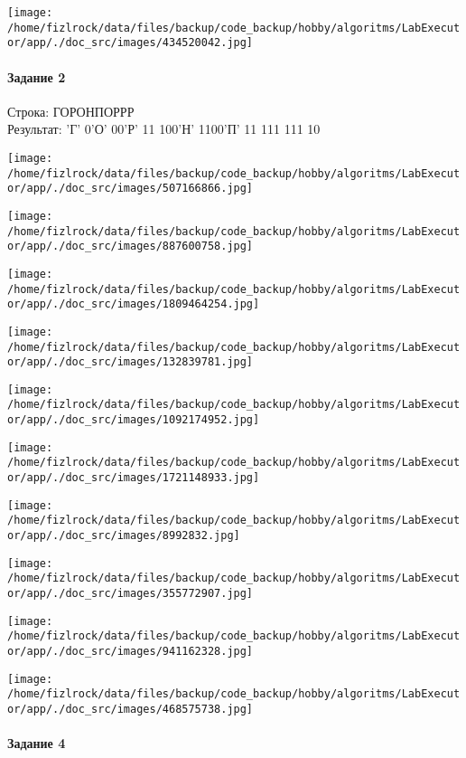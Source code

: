 \documentclass[a4paper, 12pt]{article}
\begin{document}
\texttt{[image: /home/fizlrock/data/files/backup/code\_backup/hobby/algoritms/LabExecutor/app/./doc\_src/images/434520042.jpg]}
\pagebreak
\paragraph{Задание 2}

Строка: 
ГОРОНПОРРР\\
Результат: 'Г' 0'О' 00'Р' 11 100'Н' 1100'П' 11 111 111 10

\texttt{[image: /home/fizlrock/data/files/backup/code\_backup/hobby/algoritms/LabExecutor/app/./doc\_src/images/507166866.jpg]}

\texttt{[image: /home/fizlrock/data/files/backup/code\_backup/hobby/algoritms/LabExecutor/app/./doc\_src/images/887600758.jpg]}

\texttt{[image: /home/fizlrock/data/files/backup/code\_backup/hobby/algoritms/LabExecutor/app/./doc\_src/images/1809464254.jpg]}

\texttt{[image: /home/fizlrock/data/files/backup/code\_backup/hobby/algoritms/LabExecutor/app/./doc\_src/images/132839781.jpg]}

\texttt{[image: /home/fizlrock/data/files/backup/code\_backup/hobby/algoritms/LabExecutor/app/./doc\_src/images/1092174952.jpg]}

\texttt{[image: /home/fizlrock/data/files/backup/code\_backup/hobby/algoritms/LabExecutor/app/./doc\_src/images/1721148933.jpg]}

\texttt{[image: /home/fizlrock/data/files/backup/code\_backup/hobby/algoritms/LabExecutor/app/./doc\_src/images/8992832.jpg]}

\texttt{[image: /home/fizlrock/data/files/backup/code\_backup/hobby/algoritms/LabExecutor/app/./doc\_src/images/355772907.jpg]}

\texttt{[image: /home/fizlrock/data/files/backup/code\_backup/hobby/algoritms/LabExecutor/app/./doc\_src/images/941162328.jpg]}

\texttt{[image: /home/fizlrock/data/files/backup/code\_backup/hobby/algoritms/LabExecutor/app/./doc\_src/images/468575738.jpg]}
\pagebreak
\paragraph{Задание 4}
\end{document}
